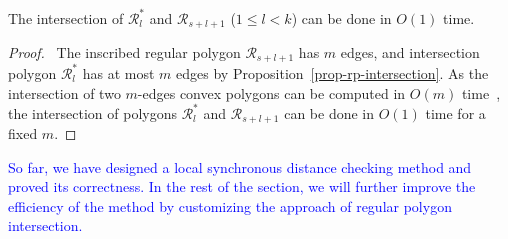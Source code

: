 \begin{prop}
\label{prop-cpi-time}
The intersection of $\mathcal{R}^*_l$ and $\mathcal{R}_{s+l+1}$ ($ 1\le l< k$) can be done in $O(1)$
time.
\end{prop}

\begin{proof}\
The inscribed regular polygon $\mathcal{R}_{s+l+1}$ has $m$ edges, and intersection polygon $\mathcal{R}^*_l$ has at most $m$ edges by Proposition~\ref{prop-rp-intersection}.
As the intersection of two $m$-edges convex polygons can be computed in $O(m)$ time~\cite{ORourke:Intersection}, the intersection of polygons $\mathcal{R}^*_l$ and $\mathcal{R}_{s+l+1}$ can be done in $O(1)$ time for a fixed $m$. \eop
\end{proof}


\textcolor{blue}{So far, we have designed a local synchronous distance checking method and proved its correctness. In the rest of the section, we will further improve the efficiency of the method by customizing the approach of regular polygon intersection.}






